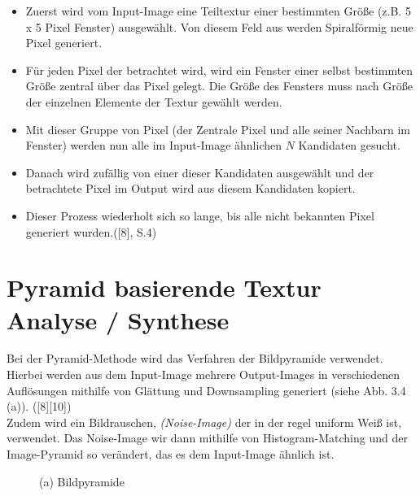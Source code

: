 \documentclass[12pt]{report}
\begin{document}
\begin{itemize}
    \item Zuerst wird vom Input-Image eine Teiltextur einer bestimmten Größe {(z.B. 5 x 5 Pixel Fenster)} ausgewählt. Von diesem Feld aus werden Spiralförmig neue Pixel generiert.
    \item Für jeden Pixel der betrachtet wird, wird ein Fenster einer selbst bestimmten Größe zentral über das Pixel gelegt.
    Die Größe des Fensters muss nach Größe der einzelnen Elemente der Textur gewählt werden.
    \item Mit dieser Gruppe von Pixel {(der Zentrale Pixel und alle seiner Nachbarn im Fenster)} werden nun alle im Input-Image ähnlichen $N$ Kandidaten gesucht.
    \item Danach wird zufällig von einer dieser Kandidaten ausgewählt und der betrachtete Pixel im Output wird aus diesem Kandidaten kopiert.
    \item Dieser Prozess wiederholt sich so lange, bis alle nicht bekannten Pixel generiert wurden.{([8], S.4)}
\end{itemize}

\section{Pyramid basierende Textur Analyse / Synthese}

Bei der Pyramid-Methode wird das Verfahren der Bildpyramide verwendet.
Hierbei werden aus dem Input-Image mehrere Output-Images in verschiedenen Auflösungen mithilfe von Glättung und Downsampling generiert {(siehe Abb. 3.4 (a))}. {([8][10])}\\
Zudem wird ein Bildrauschen, \textit{(Noise-Image)} der in der regel uniform Weiß ist, verwendet.
Das Noise-Image wir dann mithilfe von Histogram-Matching und der Image-Pyramid so verändert, das es dem Input-Image ähnlich ist.

\begin{figure}[H]
    \centering
    \caption{(a) Bildpyramide}%
\end{figure}
\end{document}
